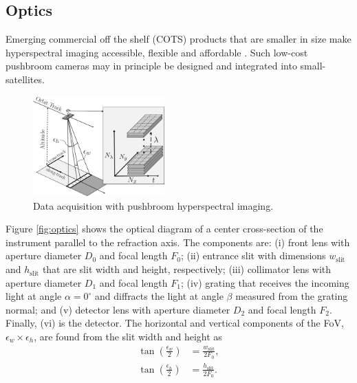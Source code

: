\subsection{Optics}\label{sec:optics}
Emerging commercial off the shelf (COTS) products that are smaller in size make hyperspectral imaging accessible, flexible and affordable \cite{Sigernes18}. Such low-cost pushbroom cameras may in principle be designed and integrated into small-satellites.
\begin{figure}[htbp]
  \centering
      \includegraphics[width=0.45\textwidth]{figs/pushbroom_scanning.png}
  \caption{Data acquisition with pushbroom hyperspectral imaging.}
	\label{fig:push_scan}
\end{figure}
Figure \ref{fig:optics} shows the optical diagram of a center cross-section of the instrument parallel to the refraction axis. The components are: (i) front lens with aperture diameter $D_0$ and focal length $F_0$; (ii) entrance slit with dimensions $w_{\text{slit}}$ and $h_{\text{slit}}$ that are slit width and height, respectively; (iii) collimator lens with aperture diameter $D_1$ and focal length $F_1$; (iv) grating that receives the incoming light at angle $\alpha=0^{\circ}$ and diffracts the light at angle $\beta$ measured from the grating normal; and (v) detector lens with aperture diameter $D_2$ and focal length $F_2$. Finally, (vi) is the detector. The horizontal and vertical components of the FoV, $\epsilon_w \times \epsilon_h$, are found from the slit width and height as
\begin{subequations}
\begin{align}
\tan{\left(\frac{\epsilon_{w}}{2}\right)} &= \frac{w_{\text{slit}}}{2F_0}, \label{eq:fov_x} \\
\tan{\left(\frac{\epsilon_{h}}{2}\right)} &= \frac{h_{\text{slit}}}{2F_0}. \label{eq:fov_y}
\end{align} 
\end{subequations}

